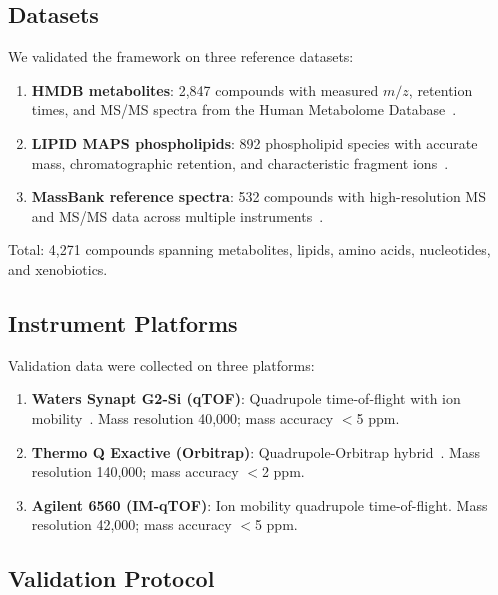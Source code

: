 \documentclass[twocolumn,10pt]{article}
\begin{document}
\subsection{Datasets}

We validated the framework on three reference datasets:

\begin{enumerate}[leftmargin=*]
\item \textbf{HMDB metabolites}: 2,847 compounds with measured $m/z$, retention times, and MS/MS spectra from the Human Metabolome Database~\cite{wishart2018hmdb}.

\item \textbf{LIPID MAPS phospholipids}: 892 phospholipid species with accurate mass, chromatographic retention, and characteristic fragment ions~\cite{fahy2009lipid}.

\item \textbf{MassBank reference spectra}: 532 compounds with high-resolution MS and MS/MS data across multiple instruments~\cite{horai2010massbank}.
\end{enumerate}

Total: 4,271 compounds spanning metabolites, lipids, amino acids, nucleotides, and xenobiotics.

\subsection{Instrument Platforms}

Validation data were collected on three platforms:

\begin{enumerate}[leftmargin=*]
\item \textbf{Waters Synapt G2-Si (qTOF)}: Quadrupole time-of-flight with ion mobility~\cite{chernushevich2001orthogonal}. Mass resolution 40,000; mass accuracy $<$5 ppm.

\item \textbf{Thermo Q Exactive (Orbitrap)}: Quadrupole-Orbitrap hybrid~\cite{makarov2000electrostatic}. Mass resolution 140,000; mass accuracy $<$2 ppm.

\item \textbf{Agilent 6560 (IM-qTOF)}: Ion mobility quadrupole time-of-flight. Mass resolution 42,000; mass accuracy $<$5 ppm.
\end{enumerate}

\subsection{Validation Protocol}
\end{document}
